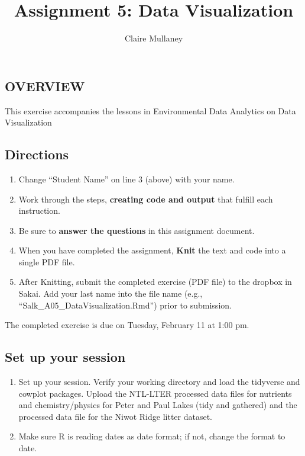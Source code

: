 \documentclass[]{article}
\title{Assignment 5: Data Visualization}
\author{Claire Mullaney}
\date{}
\providecommand{\tightlist}{%
  \setlength{\itemsep}{0pt}\setlength{\parskip}{0pt}}
\begin{document}
\maketitle

\hypertarget{overview}{%
\subsection{OVERVIEW}\label{overview}}

This exercise accompanies the lessons in Environmental Data Analytics on
Data Visualization

\hypertarget{directions}{%
\subsection{Directions}\label{directions}}

\begin{enumerate}
\def\labelenumi{\arabic{enumi}.}
\tightlist
\item
  Change ``Student Name'' on line 3 (above) with your name.
\item
  Work through the steps, \textbf{creating code and output} that fulfill
  each instruction.
\item
  Be sure to \textbf{answer the questions} in this assignment document.
\item
  When you have completed the assignment, \textbf{Knit} the text and
  code into a single PDF file.
\item
  After Knitting, submit the completed exercise (PDF file) to the
  dropbox in Sakai. Add your last name into the file name (e.g.,
  ``Salk\_A05\_DataVisualization.Rmd'') prior to submission.
\end{enumerate}

The completed exercise is due on Tuesday, February 11 at 1:00 pm.

\hypertarget{set-up-your-session}{%
\subsection{Set up your session}\label{set-up-your-session}}

\begin{enumerate}
\def\labelenumi{\arabic{enumi}.}
\item
  Set up your session. Verify your working directory and load the
  tidyverse and cowplot packages. Upload the NTL-LTER processed data
  files for nutrients and chemistry/physics for Peter and Paul Lakes
  (tidy and gathered) and the processed data file for the Niwot Ridge
  litter dataset.
\item
  Make sure R is reading dates as date format; if not, change the format
  to date.
\end{enumerate}
\end{document}
